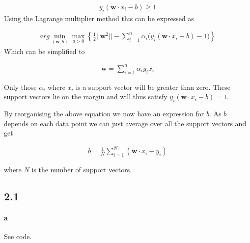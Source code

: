 \documentclass{article}
\begin{document}
\begin{align}
  y_i (\mathbf{w} \cdot x_i - b) \geq 1
\end{align}
Using the Lagrange multiplier method this can be expressed as

\begin{align}
  arg \min_{(\mathbf{w}, b)} \max_{a > 0} \left\{ \frac{1}{2} \lvert \rvert \mathbf{w}^2 \lvert \rvert -
      \sum_{i = 1}^{n}\alpha_i \big( y_i \left( \mathbf{w} \cdot x_i - b \right) - 1 \big) \right\}
\end{align}
Which can be simplified to

\begin{align}
  \mathbf{w} = \sum_{i = 1}^{n}\alpha_i y_i x_i
\end{align}

Only those $\alpha_i$ where $x_i$ is a support vector will be greater than
zero. These support vectors lie on the margin and will thus satisfy $y_i \left(
\mathbf{w} \cdot x_i - b \right) = 1$.

By reorganising the above equation we now have an expression for $b$. As $b$
depends on each data point we can just average over all the support vectors and
get

\begin{align}
  b = \frac{1}{N} \sum_{i = 1}^{N} \left( \mathbf{w} \cdot x_i - y_i \right)
\end{align}

where $N$ is the number of support vectors.


\subsection*{2.1}
\paragraph{a}
See code.
\end{document}
